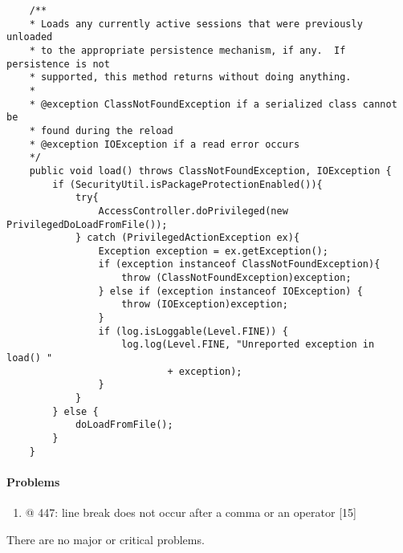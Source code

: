 	\lstset{firstnumber=426}
	\begin{lstlisting}
	/**
	* Loads any currently active sessions that were previously unloaded
	* to the appropriate persistence mechanism, if any.  If persistence is not
	* supported, this method returns without doing anything.
	*
	* @exception ClassNotFoundException if a serialized class cannot be
	* found during the reload
	* @exception IOException if a read error occurs
	*/
	public void load() throws ClassNotFoundException, IOException {
		if (SecurityUtil.isPackageProtectionEnabled()){   
			try{
				AccessController.doPrivileged(new PrivilegedDoLoadFromFile());
			} catch (PrivilegedActionException ex){
				Exception exception = ex.getException();
				if (exception instanceof ClassNotFoundException){
					throw (ClassNotFoundException)exception;
				} else if (exception instanceof IOException) {
					throw (IOException)exception;
				}
				if (log.isLoggable(Level.FINE)) {
					log.log(Level.FINE, "Unreported exception in load() "
							+ exception);
				}
			}
		} else {
			doLoadFromFile();
		}       
	}
	\end{lstlisting}

	\paragraph{Problems}
	\begin{enumerate}
		\item @ 447: line break does not occur after a comma or an operator [15]
	\end{enumerate}
	
	There are no major or critical problems.